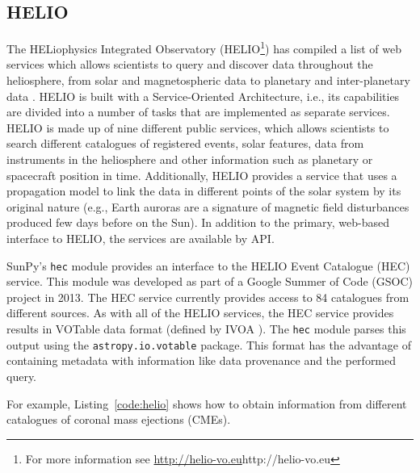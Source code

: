 \subsection{HELIO}\label{ssec:helio}

The HELiophysics Integrated Observatory (HELIO\footnote{For more information 
see \url{http://helio-vo.eu}{http://helio-vo.eu}}) has 
compiled a list of web services which allows scientists to query and 
discover data throughout the heliosphere, from solar and magnetospheric data to planetary and 
inter-planetary data \citep{dps2012}.
HELIO is built with a Service-Oriented Architecture, 
i.e., its capabilities are divided into a number of tasks that are 
implemented as separate services. 
HELIO is made up of nine different public services, 
which allows scientists to search different catalogues of registered events, 
solar features, data from instruments in the heliosphere and other information 
such as planetary or spacecraft position in time. 
Additionally, HELIO provides a service that uses a 
propagation model to link the data in different points of the solar system by 
its original nature (e.g., Earth auroras are a signature of magnetic 
field disturbances produced few days before on the Sun).
In addition to the primary, web-based interface to 
HELIO, the services are available by API.

SunPy's \texttt{hec} module provides an interface to the
HELIO Event Catalogue (HEC) service. 
This module was developed as
part of a Google Summer of Code (GSOC) project in 2013.
The HEC service currently provides access to 84 catalogues from different
sources.
As with all of the HELIO services, the HEC service provides results in VOTable 
data format (defined by IVOA \citep{ochsenbein_ivoa_2011}).
The \texttt{hec} module parses this output using the \texttt{astropy.io.votable} package.
This format has the advantage of containing metadata with information like
data provenance and the performed query.

For example, Listing~\ref{code:helio} shows how to obtain information
from different catalogues of coronal mass ejections (CMEs).


